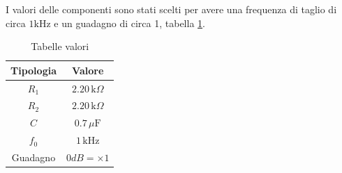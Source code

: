\documentclass[a4paper,12pt]{article}
\begin{document}
 I valori delle componenti sono stati scelti per avere una frequenza di taglio di circa $1\mathrm{kHz}$ e un guadagno di circa 1, tabella \ref{tab:valori_passa_basso}.
 
 \begin{table}[h]
 \centering
 \begin{tabular}{cc}
 \hline
 \textbf{Tipologia} & \textbf{Valore} \\
 \hline
 $R_1$ & $2.20\,\mathrm{k}\Omega$\\
 $R_2$ & $2.20\,\mathrm{k}\Omega$\\
 $C$ & $0.7\,\mu\mathrm{F}$\\
 $f_0$ & $1\,\mathrm{kHz}$\\
 Guadagno & $0dB =\times1$\\
 \hline
 \end{tabular}
 \caption{Tabelle valori}
 \label{tab:valori_passa_basso}
 \end{table}
    
\end{document}

